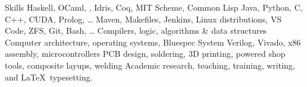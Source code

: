 
\begin{rubric}{Skills}
	Haskell, OCaml, \silver{}, Idris, Coq, MIT Scheme, Common Lisp
	Java, Python, C, C++, CUDA, Prolog, \ldots
\entry*[Tools]
	Maven, Makefiles, Jenkins, Linux distributions, VS Code, ZFS, Git, Bash, \ldots
\entry*[CS Principles] Compilers, logic, algorithms \& data structures
	Computer architecture, operating systems, Bluespec System Verilog, Vivado, x86 assembly, microcontrollers
\entry*[Hardware]
	PCB design, soldering, 3D printing, powered shop tools, composite layups, welding
\entry*[Misc.]
	Academic research, teaching, training, writing, and \LaTeX\ typesetting.
\end{rubric}
